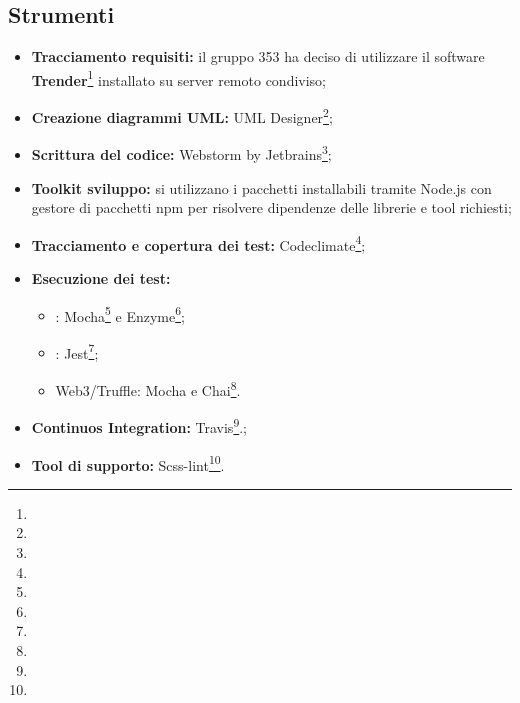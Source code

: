 \documentclass[NormeDiProgetto.tex]{subfiles}
\begin{document}
\subsection{Strumenti}
\begin{itemize}
	\item \textbf{Tracciamento requisiti:} il gruppo 353 ha deciso di utilizzare il software \textbf{Trender}\footnote{} installato su server remoto condiviso;
	\item \textbf{Creazione diagrammi UML:} {UML Designer}\footnote{};
	\item \textbf{Scrittura del codice:} Webstorm by Jetbrains\footnote{}; 
	\item \textbf{Toolkit sviluppo:} si utilizzano i pacchetti installabili tramite Node.js con gestore di pacchetti npm per risolvere dipendenze delle librerie e tool richiesti;
	\item \textbf{Tracciamento e copertura dei test:} Codeclimate\footnote{};
	\item \textbf{Esecuzione dei test:}
	\begin{itemize}
		\item {}: Mocha\footnote{} e Enzyme\footnote{};
		\item {}: Jest\footnote{};
		\item Web3/Truffle: Mocha e Chai\footnote{}.
	\end{itemize}
	\item \textbf{Continuos Integration:} Travis\footnote{}.;
	\item \textbf{Tool di supporto:} Scss-lint\footnote{}. 	
\end{itemize}
\end{document}
